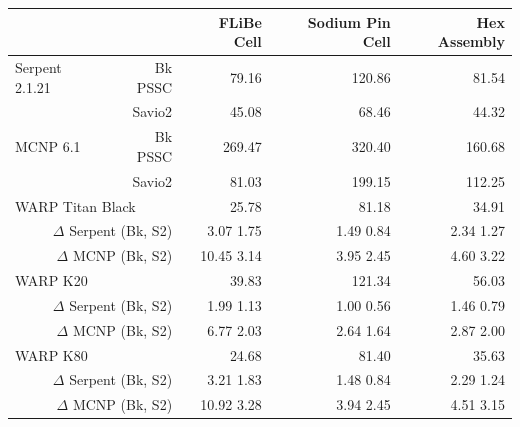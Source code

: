 \documentclass[preprint,12pt]{elsarticle}
\begin{document}
\begin{table}[h]
\smallskip

\begin{tabular}{| l r | r | r | r |}
\cline{3-5}
\multicolumn{2}{c|}{}                            & FLiBe Cell   & Sodium Pin Cell & Hex Assembly  \\
\hline                                    
Serpent 2.1.21   &   Bk PSSC                     & 79.16        & 120.86          & 81.54         \\
                 &   Savio2                      & 45.08        &  68.46          &  44.32        \\
\hline                                        
MCNP 6.1         &   Bk PSSC                     & 269.47       & 320.40          & 160.68        \\
                 &   Savio2                      & 81.03        & 199.15          & 112.25        \\
\hline                       
\multicolumn{2}{|l|}{WARP Titan Black }          &  25.78       & 81.18           & 34.91         \\
\multicolumn{2}{|r|}{$\Delta$ Serpent (Bk, S2)}  &  3.07  1.75  & 1.49  0.84      & 2.34  1.27    \\
\multicolumn{2}{|r|}{$\Delta$ MCNP    (Bk, S2)}  &  10.45 3.14  & 3.95  2.45      & 4.60  3.22    \\
\hline
\multicolumn{2}{|l|}{WARP K20 }                  & 39.83        & 121.34          & 56.03         \\
\multicolumn{2}{|r|}{$\Delta$ Serpent (Bk, S2)}  &  1.99  1.13  & 1.00  0.56      & 1.46  0.79    \\
\multicolumn{2}{|r|}{$\Delta$ MCNP    (Bk, S2)}  &  6.77  2.03  & 2.64  1.64      & 2.87  2.00    \\
\hline
\multicolumn{2}{|l|}{WARP K80   }                & 24.68        & 81.40           & 35.63         \\
\multicolumn{2}{|r|}{$\Delta$ Serpent (Bk, S2)}  & 3.21  1.83   &  1.48  0.84     &  2.29  1.24   \\
\multicolumn{2}{|r|}{$\Delta$ MCNP    (Bk, S2)}  & 10.92 3.28   &  3.94  2.45     &  4.51  3.15   \\
\hline
\end{tabular}
\end{table}
\end{document}

